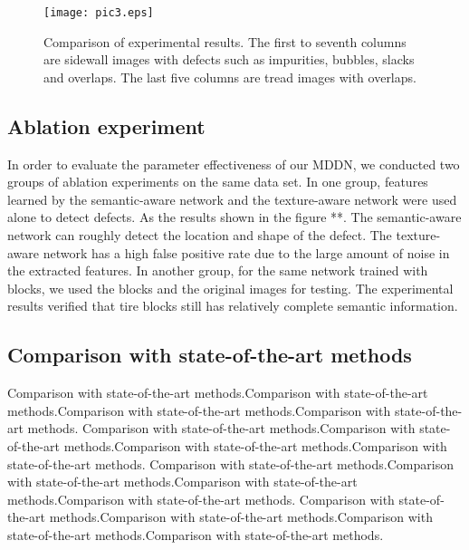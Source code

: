 \documentclass{article}
\begin{document}
\begin{figure*}[t]
  \centering
  \centerline{\texttt{[image: pic3.eps]}}
  \caption{Comparison of experimental results. The first to seventh columns are sidewall images with defects such as impurities, bubbles, slacks and overlaps. The last five columns are tread images with overlaps.}
  \label{fig3}
\end{figure*}

\subsection{Ablation experiment}
\label{Ablation experiment}
In order to evaluate the parameter effectiveness of our MDDN, we conducted two groups of ablation experiments on the same data set. In one group, features learned by the semantic-aware network and the texture-aware network were used alone to detect defects. As the results shown in the figure **. The semantic-aware network can roughly detect the location and shape of the defect. The texture-aware network has a high false positive rate due to the large amount of noise in the extracted features. In another group, for the same network trained with blocks, we used the blocks and the original images for testing. The experimental results verified that tire blocks still has relatively complete semantic information.

\subsection{Comparison with state-of-the-art methods}
\label{state-of-the-art methods}
Comparison with state-of-the-art methods.Comparison with state-of-the-art methods.Comparison with state-of-the-art methods.Comparison with state-of-the-art methods.
Comparison with state-of-the-art methods.Comparison with state-of-the-art methods.Comparison with state-of-the-art methods.Comparison with state-of-the-art methods.
Comparison with state-of-the-art methods.Comparison with state-of-the-art methods.Comparison with state-of-the-art methods.Comparison with state-of-the-art methods.
Comparison with state-of-the-art methods.Comparison with state-of-the-art methods.Comparison with state-of-the-art methods.Comparison with state-of-the-art methods.
\end{document}
